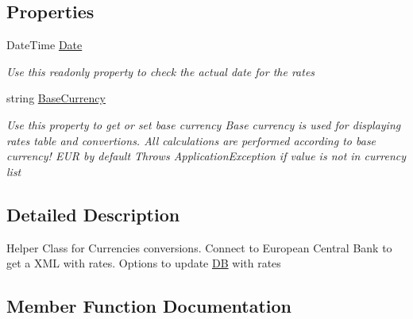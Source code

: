 \subsection*{Properties}
\begin{DoxyCompactItemize}
\item 
Date\+Time \mbox{\hyperlink{class_h_k_supply_1_1_helpers_1_1_currency_converter_1_1_currency_converter_a12acac379c89eb42f7dd164e5a5a56a2}{Date}}
\begin{DoxyCompactList}\small\item\em Use this readonly property to check the actual date for the rates \end{DoxyCompactList}\item 
string \mbox{\hyperlink{class_h_k_supply_1_1_helpers_1_1_currency_converter_1_1_currency_converter_a0ae9bc9af8a7d08f47cd3ad12030f48c}{Base\+Currency}}
\begin{DoxyCompactList}\small\item\em Use this property to get or set base currency Base currency is used for displaying rates table and convertions. All calculations are performed according to base currency! E\+UR by default Throws Application\+Exception if value is not in currency list \end{DoxyCompactList}\end{DoxyCompactItemize}


\subsection{Detailed Description}
Helper Class for Currencies conversions. Connect to European Central Bank to get a X\+ML with rates. Options to update \mbox{\hyperlink{namespace_h_k_supply_1_1_d_b}{DB}} with rates 



\subsection{Member Function Documentation}
\mbox{\label{class_h_k_supply_1_1_helpers_1_1_currency_converter_1_1_currency_converter_af9501a149c0ed63c5cdd2faaac3b5e44}} 
